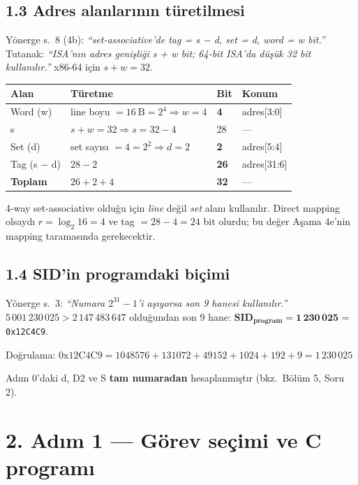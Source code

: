 \documentclass[11pt,a4paper]{article}
\newcommand{\tl}{\texttt}
\begin{document}
\subsection*{1.3 Adres alanlarının türetilmesi}

Yönerge s.~8 (4b): \textit{``set-associative'de tag = s − d, set = d, word = w bit.''}
Tutanak: \textit{``ISA'nın adres genişliği s + w bit; 64-bit ISA'da düşük 32 bit kullanılır.''}
x86-64 için $s + w = 32$.

\begin{longtable}{p{3.2cm}p{7.4cm}p{2.0cm}p{2.2cm}}
\toprule
\textbf{Alan} & \textbf{Türetme} & \textbf{Bit} & \textbf{Konum}\\
\midrule
Word (w)    & line boyu $= 16\ \text{B} = 2^4 \Rightarrow w = 4$ & \textbf{4}  & adres[3:0]\\
s           & $s + w = 32 \Rightarrow s = 32 - 4$                & 28          & ---\\
Set (d)     & set sayısı $= 4 = 2^2 \Rightarrow d = 2$           & \textbf{2}  & adres[5:4]\\
Tag (s − d) & $28 - 2$                                           & \textbf{26} & adres[31:6]\\
\midrule
\textbf{Toplam} & $26 + 2 + 4$ & \textbf{32} & ---\\
\bottomrule
\end{longtable}

4-way set-associative olduğu için \textit{line} değil \textit{set} alanı kullanılır. Direct mapping
olsaydı $r = \log_2 16 = 4$ ve tag $= 28 - 4 = 24$ bit olurdu; bu değer Aşama 4e'nin mapping
taramasında gerekecektir.

\subsection*{1.4 SID'in programdaki biçimi}

Yönerge s.~3: \textit{``Numara $2^{31}-1$'i aşıyorsa son 9 hanesi kullanılır.''}
$5\,001\,230\,025 > 2\,147\,483\,647$ olduğundan son 9 hane:
$\mathbf{SID_{program} = 1\,230\,025}$ = \tl{0x12C4C9}.

Doğrulama: $\text{0x12C4C9} = 1048576 + 131072 + 49152 + 1024 + 192 + 9 = 1\,230\,025$ \checkmark

Adım 0'daki d, D2 ve S \textbf{tam numaradan} hesaplanmıştır (bkz.\ Bölüm 5, Soru 2).

\section*{2. Adım 1 --- Görev seçimi ve C programı}
\end{document}
